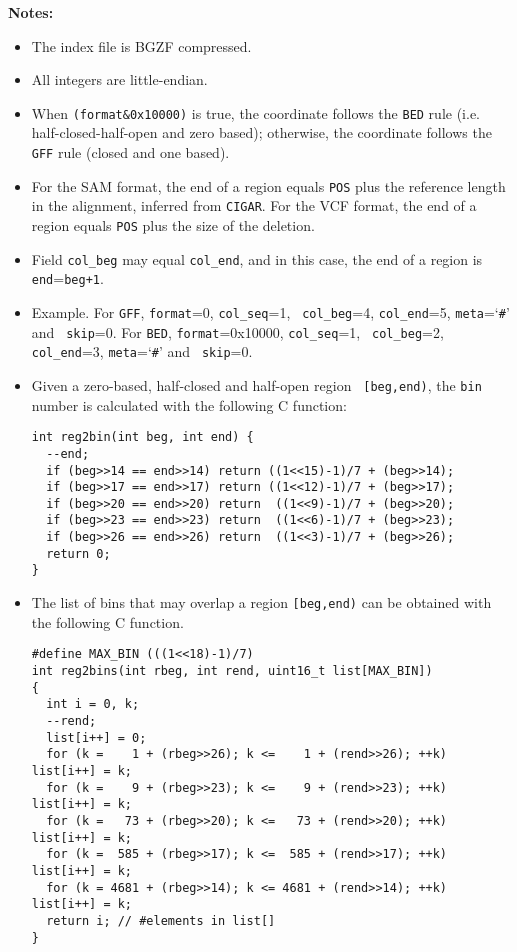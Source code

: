 \documentclass[10pt]{article}
\begin{document}
{\bf Notes:}

\begin{itemize}
\item The index file is BGZF compressed.
\item All integers are little-endian.
\item When {\tt (format\&0x10000)} is true, the coordinate follows the
  {\tt BED} rule (i.e. half-closed-half-open and zero based); otherwise,
  the coordinate follows the {\tt GFF} rule (closed and one based).
\item For the SAM format, the end of a region equals {\tt POS} plus the
  reference length in the alignment, inferred from {\tt CIGAR}. For the
  VCF format, the end of a region equals {\tt POS} plus the size of the
  deletion.
\item Field {\tt col\_beg} may equal {\tt col\_end}, and in this case,
  the end of a region is {\tt end}={\tt beg+1}.
\item Example. For {\tt GFF}, {\tt format}=0, {\tt col\_seq}=1, {\tt
    col\_beg}=4, {\tt col\_end}=5, {\tt meta}=`{\tt \#}' and {\tt
    skip}=0. For {\tt BED}, {\tt format}=0x10000, {\tt col\_seq}=1, {\tt
    col\_beg}=2, {\tt col\_end}=3, {\tt meta}=`{\tt \#}' and {\tt
    skip}=0.
\item Given a zero-based, half-closed and half-open region {\tt
    [beg,end)}, the {\tt bin} number is calculated with the following C
  function:
\begin{verbatim}
int reg2bin(int beg, int end) {
  --end;
  if (beg>>14 == end>>14) return ((1<<15)-1)/7 + (beg>>14);
  if (beg>>17 == end>>17) return ((1<<12)-1)/7 + (beg>>17);
  if (beg>>20 == end>>20) return  ((1<<9)-1)/7 + (beg>>20);
  if (beg>>23 == end>>23) return  ((1<<6)-1)/7 + (beg>>23);
  if (beg>>26 == end>>26) return  ((1<<3)-1)/7 + (beg>>26);
  return 0;
}
\end{verbatim}
\item The list of bins that may overlap a region {\tt [beg,end)} can be
  obtained with the following C function.
\begin{verbatim}
#define MAX_BIN (((1<<18)-1)/7)
int reg2bins(int rbeg, int rend, uint16_t list[MAX_BIN])
{
  int i = 0, k;
  --rend;
  list[i++] = 0;
  for (k =    1 + (rbeg>>26); k <=    1 + (rend>>26); ++k) list[i++] = k;
  for (k =    9 + (rbeg>>23); k <=    9 + (rend>>23); ++k) list[i++] = k;
  for (k =   73 + (rbeg>>20); k <=   73 + (rend>>20); ++k) list[i++] = k;
  for (k =  585 + (rbeg>>17); k <=  585 + (rend>>17); ++k) list[i++] = k;
  for (k = 4681 + (rbeg>>14); k <= 4681 + (rend>>14); ++k) list[i++] = k;
  return i; // #elements in list[]
}
\end{verbatim}
\end{itemize}
\end{document}

